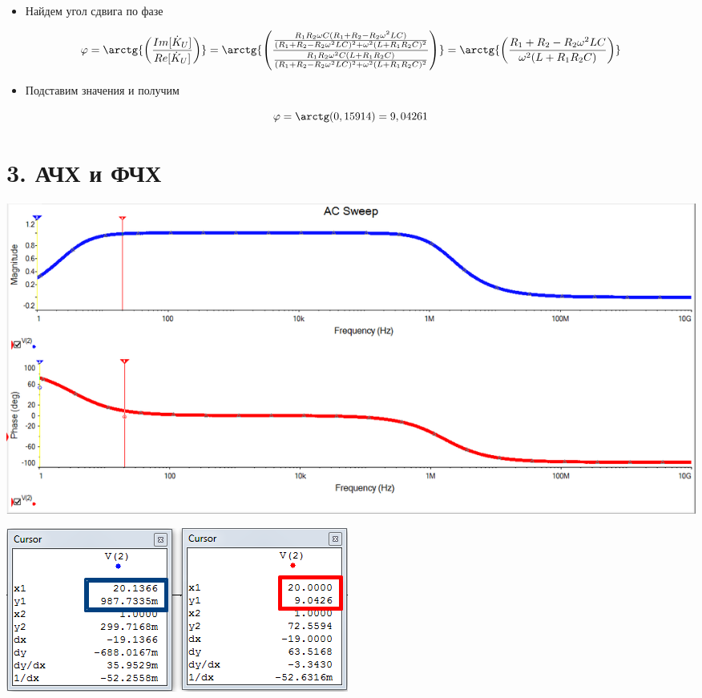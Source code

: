 \documentclass[12pt, a4paper]{report}
\begin{document}
    \newpage

    \begin{itemize}
        \item Найдем угол сдвига по фазе
    \end{itemize}
    \[ \varphi = \arctg{\left( \frac{Im[\dot{K}_U]}{Re[\dot{K}_U]} \right)} = \arctg{\left( \frac{\frac{R_{1}R_{2}\omega C(R_1 + R_2 - R_{2}\omega^{2}LC)}{(R_1 + R_2 - R_{2}\omega^{2}LC)^2 + \omega^{2}(L + R_{1}R_{2}C)^2}} {\frac{R_{1}R_{2}\omega^{2} C(L + R_{1}R_{2}C)}{(R_1 + R_2 - R_{2}\omega^{2}LC)^2 + \omega^{2}(L + R_{1}R_{2}C)^2}} \right)} = \arctg{\left( \frac{R_1 + R_2 - R_{2}\omega^{2}LC}{\omega^{2}(L + R_{1}R_{2}C)} \right)}\]\bigskip
    \begin{itemize}
        \item Подставим значения и получим
    \end{itemize}
    \[ \varphi = \arctg(0,15914) = 9,04261 \]\bigskip
    \section{3. АЧХ и ФЧХ}
    \begin{center}
        \includegraphics[scale = 0.5]{photo2.png}
    \end{center}\bigskip
    \begin{center}
        \includegraphics[scale = 1.1]{photo3.png}
    \end{center}
\end{document}
